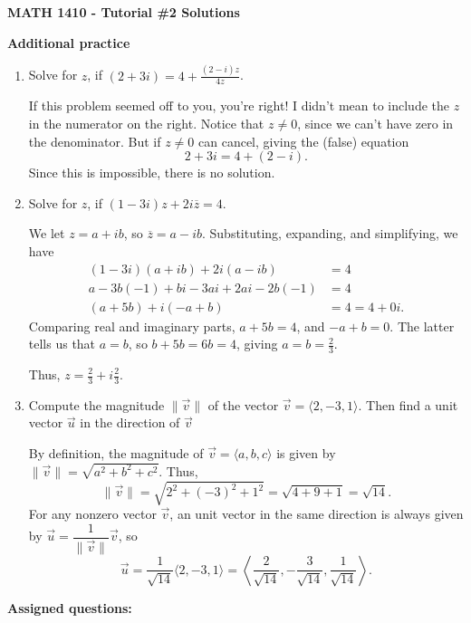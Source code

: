 \documentclass[12pt]{article}
\newcommand{\len}[1]{\lVert #1\rVert}
\begin{document}
\author{Instructor: Sean Fitzpatrick}
\thispagestyle{empty}
\begin{center}
{\bf MATH 1410 - Tutorial \#2 Solutions}
\end{center}


\textbf{Additional practice}
\begin{enumerate}
\item Solve for $z$, if $(2+3i)=4+\frac{(2-i)z}{4z}$.

If this problem seemed off to you, you're right! I didn't mean to include the $z$ in the numerator on the right. Notice that $z\neq 0$, since we can't have zero in the denominator. But if $z\neq 0$ can cancel, giving the (false) equation
\[
2+3i=4+(2-i).
\]
Since this is impossible, there is no solution.

\item Solve for $z$, if $(1-3i)z+2i\overline{z}=4$.

We let $z=a+ib$, so $\overline{z}=a-ib$. Substituting, expanding, and simplifying, we have
\begin{align*}
(1-3i)(a+ib)+2i(a-ib)&=4\\
a-3b(-1)+bi-3ai+2ai-2b(-1)&=4\\
(a+5b)+i(-a+b)&=4=4+0i.
\end{align*}
Comparing real and imaginary parts, $a+5b=4$, and $-a+b=0$. The latter tells us that $a=b$, so $b+5b=6b=4$, giving $a=b=\frac23$.

Thus, $z=\frac23+i\frac23$.
\item Compute the magnitude $\len{\vec{v}}$ of the vector $\vec{v}=\langle 2,-3,1\rangle$. Then find a unit vector $\vec{u}$ in the direction of $\vec{v}$

By definition, the magnitude of $\vec{v}=\langle a,b,c\rangle$ is given by $\len{\vec{v}}=\sqrt{a^2+b^2+c^2}$. Thus,
\[
\len{\vec{v}}=\sqrt{2^2+(-3)^2+1^2}=\sqrt{4+9+1}=\sqrt{14}.
\]
For any nonzero vector $\vec{v}$, an unit vector in the same direction is always given by $\vec{u} = \dfrac{1}{\len{\vec{v}}}\vec{v}$, so
\[
\vec{u}=\frac{1}{\sqrt{14}}\langle 2,-3,1\rangle = \left\langle \frac{2}{\sqrt{14}},-\frac{3}{\sqrt{14}},\frac{1}{\sqrt{14}}\right\rangle.
\]
\end{enumerate}
\pagebreak

\textbf{Assigned questions:}
\end{document}
